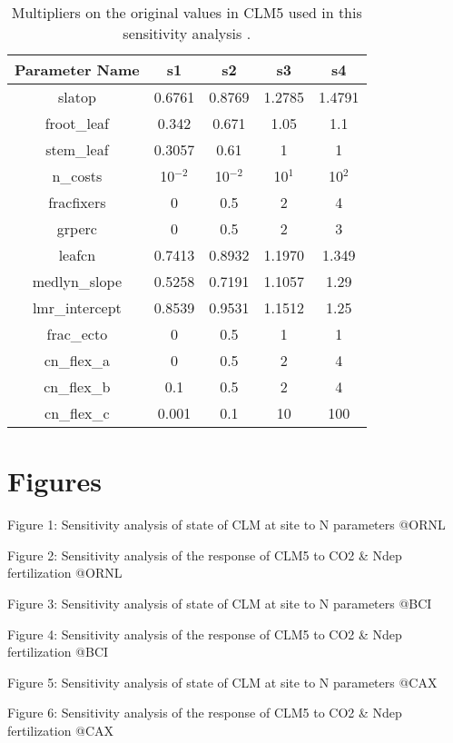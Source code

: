 \documentclass[draft,linenumbers]{agujournal}
\begin{document}
 \begin{table}
\begin{center}
\begin{tabular}{ |c|c|c|c|c| } 
 \hline
 Parameter Name & s1 &s2 & s3 & s4\\
  \hline
 slatop & 0.6761 & 0.8769 &1.2785 &1.4791\\ 
 froot\_leaf &  0.342 &0.671 &1.05 & 1.1\\
 stem\_leaf  &  0.3057 &0.61 &1 &1\\ 
 n\_costs    & 10$^{-2}$ &10$^{-2}$&  10$^{1}$& 10$^{2}$\\
 fracfixers  & 0 &0.5 & 2 & 4 \\
  grperc  &  0 & 0.5& 2 & 3\\
  leafcn  &0.7413 & 0.8932 & 1.1970  & 1.349\\
  
     medlyn\_slope  &0.5258 & 0.7191 & 1.1057  &1.29\\
      lmr\_intercept & 0.8539 & 0.9531 & 1.1512& 1.25\\
      frac\_ecto & 0 &0.5& 1 & 1 \\
      cn\_flex\_a &0 &0.5 & 2  &4\\
      cn\_flex\_b & 0.1 & 0.5 & 2  & 4\\
      cn\_flex\_c &0.001 & 0.1 & 10 & 100\\
\hline
\end{tabular}
\end{center}
\caption{Multipliers on the original values in CLM5 used in this sensitivity analysis .}
\label{table_ranges}
\end{table}



\section{Figures}


Figure 1: Sensitivity analysis of state of CLM at site to N parameters @ORNL

Figure 2: Sensitivity analysis of the response of CLM5 to CO2 \& Ndep fertilization @ORNL

Figure 3: Sensitivity analysis of state of CLM at site to N parameters @BCI

Figure 4: Sensitivity analysis of the response of CLM5 to CO2 \& Ndep fertilization @BCI

Figure 5: Sensitivity analysis of state of CLM at site to N parameters @CAX

Figure 6: Sensitivity analysis of the response of CLM5 to CO2 \& Ndep fertilization @CAX
\end{document}
